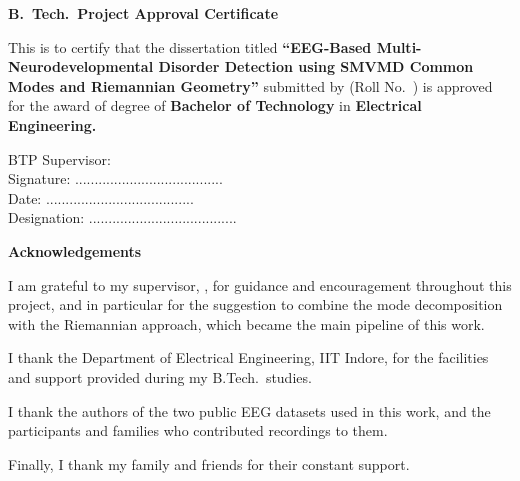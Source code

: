 \newpage
\begin{center}{\Large\bf B.\ Tech.\ Project Approval Certificate}\vspace{1.0cm}\end{center}
\par This is to certify that the dissertation titled \textbf{``EEG-Based
Multi-Neurodevelopmental Disorder Detection using SMVMD Common Modes and Riemannian Geometry''}
submitted by \textbf{\StudentName} (Roll No.\ \RollNo) is approved for the award of
degree of \textbf{Bachelor of Technology} in \textbf{Electrical Engineering.}
\vspace{1.0cm}
\begin{flushright}
BTP Supervisor: \hspace{0.7cm} \SupervisorName\\[0.8cm]
Signature: \hspace{0.7cm} ......................................\\ \vspace{1.0cm}
Date: \hspace{0.7cm} ......................................\\ \vspace{1.0cm}
Designation: \hspace{0.7cm} ......................................\\
\end{flushright}

\newpage
\begin{center}{\Large\bf Acknowledgements}\end{center}
\par I am grateful to my supervisor, \SupervisorName, for guidance and encouragement throughout
this project, and in particular for the suggestion to combine the mode decomposition with the
Riemannian approach, which became the main pipeline of this work.
\par I thank the Department of Electrical Engineering, IIT Indore, for the facilities and
support provided during my B.Tech.\ studies.
\par I thank the authors of the two public EEG datasets used in this work, and the participants
and families who contributed recordings to them.
\par Finally, I thank my family and friends for their constant support.
\vspace{1.5cm}
\begin{flushright}\StudentName\end{flushright}

